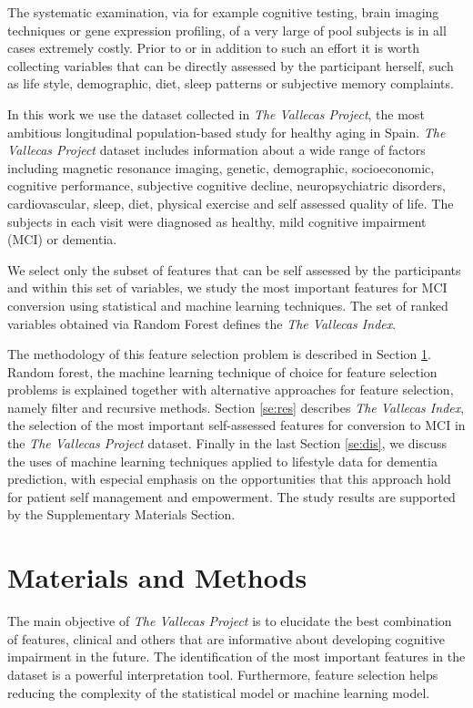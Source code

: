 \documentclass[preprint,12pt]{elsarticle}
\begin{document}
The systematic examination, via for example cognitive testing, brain imaging techniques or gene expression profiling, of a very large of pool subjects is in all cases extremely costly. Prior to or in addition to such an effort it is worth collecting variables that can be directly assessed by the participant herself, such as life style, demographic, diet, sleep patterns or subjective memory complaints. 

In this work we use the dataset collected in \emph{The Vallecas Project}, the most ambitious longitudinal population-based study for healthy aging in Spain. 
\emph{The Vallecas Project} dataset includes information about a wide range of factors including magnetic resonance imaging, genetic, demographic, socioeconomic, cognitive performance, subjective cognitive decline, neuropsychiatric disorders, cardiovascular, sleep, diet, physical exercise and self assessed quality of life. The subjects in each visit were diagnosed as healthy, mild cognitive impairment (MCI) or dementia.

We select only the subset of features that can be self assessed by the participants and within this set of variables, we study the most important features for MCI conversion using statistical and machine learning techniques. The set of ranked variables obtained via Random Forest defines the \emph{The Vallecas Index}. 

The methodology of this feature selection problem is described in Section \ref{se:mandm}. Random forest, the machine learning technique of choice for feature selection problems is explained together with alternative approaches for feature selection, namely filter and recursive methods. 
Section \ref{se:res} describes \emph{The Vallecas Index}, the selection of the most important self-assessed features for conversion to MCI in the \emph{The Vallecas Project} dataset. Finally in the last Section \ref{se:dis}, we discuss the uses of machine learning techniques applied to lifestyle data for dementia prediction, with especial emphasis on the opportunities that this approach hold for patient self management and empowerment. 
The study results are supported by the  Supplementary Materials Section. 


\section{Materials and Methods}
\label{se:mandm}

The main objective of \emph{The Vallecas Project} is to elucidate the best combination of features, clinical and others that are informative about developing cognitive impairment in the future.
The identification of the most important features in the dataset is a powerful interpretation tool. Furthermore, feature selection helps reducing the complexity of the statistical model or machine learning model.
\end{document}
